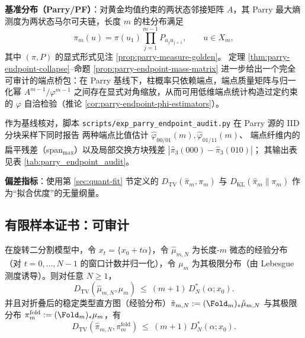 \textbf{基准分布（Parry/PF）}：对黄金均值约束的两状态邻接矩阵 $A$，其 Parry 最大熵测度为两状态马尔可夫链，长度 $m$ 的柱分布满足
\[
\pi_m(u)=\pi(u_1)\prod_{j=1}^{m-1}P_{u_j u_{j+1}},\qquad u\in X_m,
\]
其中 $(\pi,P)$ 的显式形式见注 \ref{prop:parry-measure-golden}。
定理 \ref{thm:parry-endpoint-collapse}--命题 \ref{prop:parry-endpoint-mass-matrix} 进一步给出一个完全可审计的端点桥包：在 Parry 基线下，柱概率只依赖端点，端点质量矩阵与归一化幂 \(A^{m-1}/\varphi^{m-1}\) 之间存在显式对角缩放，从而可用低维端点统计构造过定约束的 \(\varphi\) 自洽检验（推论 \ref{cor:parry-endpoint-phi-estimators}）。

\begin{remark}\label{rem:parry-endpoint-audit}
作为基线核对，脚本 \texttt{scripts/exp\_parry\_endpoint\_audit.py} 在 Parry 源的 IID 分块采样下同时报告
两种端点比值估计 \(\widehat\varphi_{00/01}(m),\widehat\varphi_{01/11}(m)\)、
端点纤维内的扁平残差（span\(_{\max}\)）以及局部交换方块残差 \(|\hat\pi_3(000)-\hat\pi_3(010)|\)；
其输出表见表 \ref{tab:parry_endpoint_audit}。
\end{remark}


\textbf{偏差指标}：使用第 \ref{sec:quant-fit} 节定义的
\(
D_{\mathrm{TV}}(\hat{\pi}_m,\pi_m)
\)
与
\(
D_{\mathrm{KL}}(\hat{\pi}_m\|\pi_m)
\)
作为“拟合优度”的无量纲量。

\subsection{有限样本证书：可审计}


\begin{theorem}\label{thm:tv-certificate-hist}
在旋转二分割模型中，令 $x_t=\{x_0+t\alpha\}$，令 $\hat{\mu}_{m,N}$ 为长度-$m$ 微态的经验分布（对 $t=0,\dots,N-1$ 的窗口计数并归一化），令 $\mu_m$ 为其极限分布（由 Lebesgue 测度诱导）。则对任意 $N\ge 1$，
\[
D_{\mathrm{TV}}(\hat{\mu}_{m,N},\mu_m)\ \le\ (m+1)\,D_N^*(\alpha;x_0).
\]
并且对折叠后的稳定类型直方图（经验分布）$\hat{\pi}_{m,N}:=(\Fold_m)_*\hat{\mu}_{m,N}$ 与其极限分布 $\pi_m^{\mathrm{fold}}:=(\Fold_m)_*\mu_m$，有
\[
D_{\mathrm{TV}}(\hat{\pi}_{m,N},\pi_m^{\mathrm{fold}})\ \le\ (m+1)\,D_N^*(\alpha;x_0).
\]
\end{theorem}

